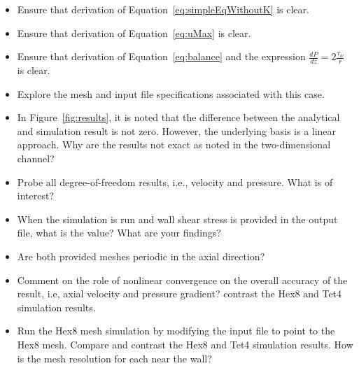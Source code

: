 \documentclass{article}
\begin{document}
\begin{itemize}
	\item Ensure that derivation of Equation~\ref{eq:simpleEqWithoutK} is clear.
	\item Ensure that derivation of Equation~\ref{eq:uMax} is clear.
	\item Ensure that derivation of Equation~\ref{eq:balance} and the expression
           $\frac{dP}{dz} = 2\frac{\tau_w}{r}$ is clear.
	\item Explore the mesh and input file specifications associated with this case.
	\item In Figure~\ref{fig:results}, it is noted that the difference between
          the analytical and simulation result is not zero. However, the underlying
          basis is a linear approach. Why are the results not exact as noted in the two-dimensional
          channel?
        \item Probe all degree-of-freedom results, i.e., velocity and pressure. What is of interest?
        \item When the simulation is run and wall shear stress is provided in the output file,
          what is the value? What are your findings?
        \item Are both provided meshes periodic in the axial direction?
        \item Comment on the role of nonlinear convergence on the overall accuracy of the result, i.e,
          axial velocity and pressure gradient?
          contrast the Hex8 and Tet4 simulation results.
        \item Run the Hex8 mesh simulation by modifying the input file to point to the Hex8 mesh. Compare and
          contrast the Hex8 and Tet4 simulation results. How is the mesh resolution for each near the wall?
\end{itemize}
\end{document}
